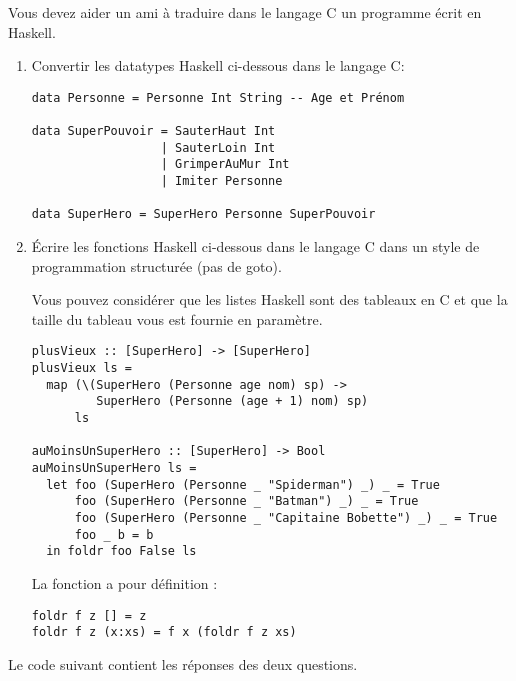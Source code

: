 \begin{Exercise}
  \label{ex:superhero}
  Vous devez aider un ami à traduire dans le langage C un programme
  écrit en Haskell.

\begin{enumerate}
\item
Convertir les datatypes Haskell ci-dessous dans le langage C:
\begin{verbatim}
data Personne = Personne Int String -- Age et Prénom

data SuperPouvoir = SauterHaut Int
                  | SauterLoin Int
                  | GrimperAuMur Int
                  | Imiter Personne

data SuperHero = SuperHero Personne SuperPouvoir

\end{verbatim}

\item
Écrire les fonctions Haskell ci-dessous dans le langage C dans un style
de programmation structurée (pas de goto).

Vous pouvez considérer que les listes Haskell sont des tableaux en C
et que la taille du tableau vous est fournie en paramètre.
\begin{verbatim}
plusVieux :: [SuperHero] -> [SuperHero]
plusVieux ls = 
  map (\(SuperHero (Personne age nom) sp) ->
         SuperHero (Personne (age + 1) nom) sp)
      ls

auMoinsUnSuperHero :: [SuperHero] -> Bool
auMoinsUnSuperHero ls =
  let foo (SuperHero (Personne _ "Spiderman") _) _ = True
      foo (SuperHero (Personne _ "Batman") _) _ = True
      foo (SuperHero (Personne _ "Capitaine Bobette") _) _ = True
      foo _ b = b
  in foldr foo False ls
\end{verbatim}

La fonction  a pour définition :
\begin{verbatim}
foldr f z [] = z 
foldr f z (x:xs) = f x (foldr f z xs) 
\end{verbatim}
\end{enumerate}
\end{Exercise}
\begin{Answer}
  Le code suivant contient les réponses des deux questions.
  
\end{Answer}